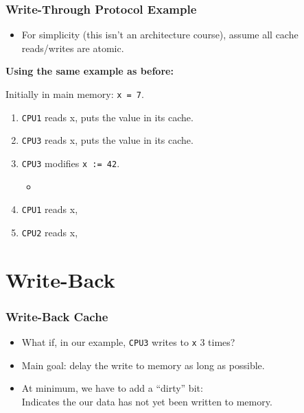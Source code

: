 \documentclass[aspectratio=43]{beamer}
\newenvironment{changemargin}[1]{%
  \begin{list}{}{%
    \setlength{\topsep}{0pt}%
    \setlength{\leftmargin}{#1}%
    \setlength{\rightmargin}{1em}
    \setlength{\listparindent}{\parindent}%
    \setlength{\itemindent}{\parindent}%
    \setlength{\parsep}{\parskip}%
  }%
  \item[]}{\end{list}}
\begin{document}
\begin{frame}
  \frametitle{Write-Through Protocol Example}

  \begin{changemargin}{1cm}

  \begin{itemize}
    \item For simplicity (this isn't an architecture course), assume all cache
      reads/writes are atomic.
  \end{itemize}
  \vfill
  {\bf Using the same example as before:}

  Initially in main memory: {\tt x = 7}.

  \begin{enumerate}
    \item {\tt CPU1} reads x, puts the value in its cache. 
    \item {\tt CPU3} reads x, puts the value in its cache. 
    \item {\tt CPU3} modifies {\tt x := 42}. 
      \begin{itemize}
        \item {}
      \end{itemize}
    \item {\tt CPU1} reads x, 
    \item {\tt CPU2} reads x, 
  \end{enumerate}
  \end{changemargin}
\end{frame}

\section{Write-Back}
\begin{frame}
  \frametitle{Write-Back Cache}

  \begin{changemargin}{.75cm}

  \begin{itemize}
    \item What if, in our example, {\tt CPU3} writes to {\tt x} 3 times?\\[1em]
    \item Main goal: delay the write to memory as long as possible.\\[1em]
    \item At minimum, we have to add a ``dirty'' bit:\\
     \quad Indicates the our data has not yet been written to memory.
  \end{itemize}
  \end{changemargin}

\end{frame}
\end{document}
